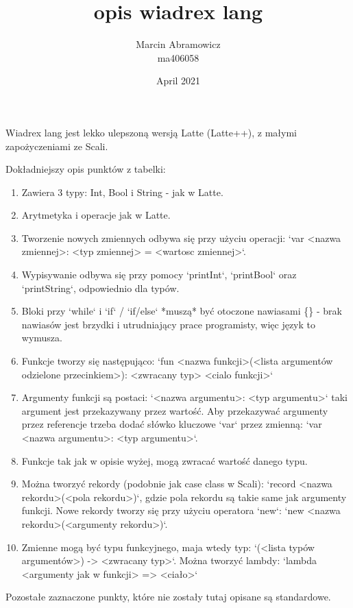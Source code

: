 \documentclass{article}
\title{opis wiadrex lang}
\author{Marcin Abramowicz \\ ma406058}
\date{April 2021}
\newcommand\setItemnumber[1]{\setcounter{enumi}{\numexpr#1-1\relax}}
\begin{document}
    \maketitle

    Wiadrex lang jest lekko ulepszoną wersją Latte (Latte++), z małymi zapożyczeniami ze Scali.
    
    Dokładniejszy opis punktów z tabelki:
    
    \begin{enumerate}
        \item
            Zawiera 3 typy: Int, Bool i String - jak w Latte.
            
        \item
            Arytmetyka i operacje jak w Latte.
        
        \item
            Tworzenie nowych zmiennych odbywa się przy użyciu operacji: `var <nazwa zmiennej>: <typ zmiennej> = <wartosc zmiennej>`.
            
        \item
            Wypisywanie odbywa się przy pomocy `printInt`, `printBool` oraz `printString`, odpowiednio dla typów.
            
        \item
            Bloki przy `while` i `if` / `if/else` *muszą* być otoczone nawiasami \{\} - brak nawiasów jest brzydki i utrudniający prace programisty, więc język to wymusza.
            
        \item
            Funkcje  tworzy się następująco: `fun <nazwa funkcji>(<lista argumentów odzielone przecinkiem>): <zwracany typ> {<cialo funkcji>}`
            
        \item 
            Argumenty funkcji są postaci: `<nazwa argumentu>: <typ argumentu>` taki argument jest przekazywany przez wartość. Aby przekazywać argumenty przez referencje trzeba dodać słówko kluczowe `var` przez zmienną: `var <nazwa argumentu>: <typ argumentu>`.
            
        \setItemnumber{11}
        \item
            Funkcje tak jak w opisie wyżej, mogą zwracać wartość danego typu.
            
        \setItemnumber{14}
        \item
            Można tworzyć rekordy (podobnie jak case class w Scali): `record <nazwa rekordu>(<pola rekordu>)`, gdzie pola rekordu są takie same jak argumenty funkcji. Nowe rekordy tworzy się przy użyciu operatora `new`: `new <nazwa rekordu>(<argumenty rekordu>)`.
        
        \setItemnumber{17}
        \item
            Zmienne mogą być typu funkcyjnego, maja wtedy typ: `(<lista typów argumentów>) -> <zwracany typ>`. Można tworzyć lambdy: `lambda <argumenty jak w funkcji> => {<ciało>}`
    \end{enumerate}
    
    Pozostałe zaznaczone punkty, które nie zostały tutaj opisane są standardowe.
    
\end{document}
